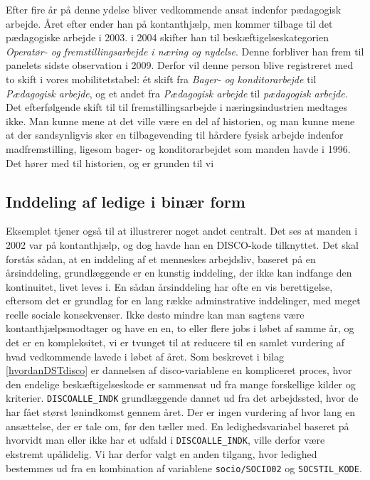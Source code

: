 Efter fire år på denne ydelse bliver vedkommende ansat indenfor pædagogisk arbejde. Året efter ender han på kontanthjælp, men kommer tilbage til det pædagogiske arbejde i 2003. i 2004 skifter han til beskæftigelseskategorien \emph{Operatør- og fremstillingsarbejde i næring og nydelse}. Denne forbliver han frem til panelets sidste observation i 2009. Derfor vil denne person blive registreret med to skift i vores mobilitetstabel: ét skift fra \emph{Bager- og konditorarbejde} til \emph{Pædagogisk arbejde}, og et andet fra \emph{Pædagogisk arbejde} til \emph{pædagogisk arbejde}. Det efterfølgende skift til til fremstillingsarbejde i næringsindustrien medtages ikke. Man kunne mene at det ville være en del af historien, og man kunne mene at der sandsynligvis sker en tilbagevending til hårdere fysisk arbejde indenfor madfremstilling, ligesom bager- og konditorarbejdet som manden havde i 1996. Det hører med til historien, og er grunden til vi %

\subsection{Inddeling af ledige i binær form}

Eksemplet tjener også til at illustrerer noget andet centralt. Det ses at manden i 2002 var på kontanthjælp, og dog havde han en DISCO-kode tilknyttet. Det skal forstås sådan, at en inddeling af et menneskes arbejdsliv, baseret på en årsinddeling, grundlæggende er en kunstig inddeling, der ikke kan indfange den kontinuitet, livet leves i. En sådan årsinddeling har ofte en vis berettigelse, eftersom det er grundlag for en lang række adminstrative inddelinger, med meget reelle sociale konsekvenser. Ikke desto mindre kan man sagtens være kontanthjælpsmodtager og have en en, to eller flere jobs i løbet af samme år, og det er en kompleksitet, vi er tvunget til at reducere til en samlet vurdering af hvad vedkommende lavede i løbet af året. Som beskrevet i bilag \ref{hvordanDSTdisco} er dannelsen af disco-variablene en kompliceret proces, hvor den endelige beskæftigelseskode er sammensat ud fra mange forskellige kilder og kriterier. \texttt{DISCOALLE\_INDK} grundlæggende dannet ud fra det arbejdssted, hvor de har fået størst lønindkomst gennem året. Der er ingen vurdering af hvor lang en ansættelse, der er tale om, før den tæller med. En ledighedsvariabel baseret på hvorvidt man eller ikke har et udfald i \texttt{DISCOALLE\_INDK}, ville derfor være ekstremt upålidelig. Vi har derfor valgt en anden tilgang, hvor ledighed bestemmes ud fra en kombination af variablene \texttt{socio/SOCIO02} og \texttt{SOCSTIL\_KODE}.

